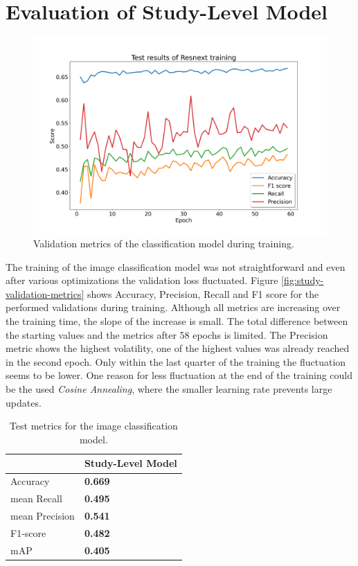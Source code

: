 \section{Evaluation of Study-Level Model}

\begin{figure}[h]
	\centering
	\includegraphics[width=.7\linewidth]{img/test_metrics_study_58.png}
	\caption{Validation metrics of the classification model during training.}
	\label{fig:study-validation-metrics}
\end{figure}

The training of the image classification model was not straightforward and even after various optimizations the validation loss fluctuated. Figure \vref{fig:study-validation-metrics} shows Accuracy, Precision, Recall and F1 score for the performed validations during training. Although all metrics are increasing over the training time, the slope of the increase is small. The total difference between the starting values and the metrics after 58 epochs is limited. The Precision metric shows the highest volatility, one of the highest values was already reached in the second epoch. Only within the last quarter of the training the fluctuation seems to be lower. One reason for less fluctuation at the end of the training could be the used \textit{Cosine Annealing}, where the smaller learning rate prevents large updates.

\begin{table}
	\begin{tabular}{l|l}
		&    Study-Level Model  \\ \hline
		Accuracy 		& \textbf{0.669} \\
		mean Recall		& \textbf{0.495} \\
		mean Precision	& \textbf{0.541} \\
		F1-score		& \textbf{0.482} \\
		mAP 	    	& \textbf{0.405} \\
	\end{tabular}
	\centering
	\caption{Test metrics for the image classification model.}
	\label{table:study-results}
\end{table}

